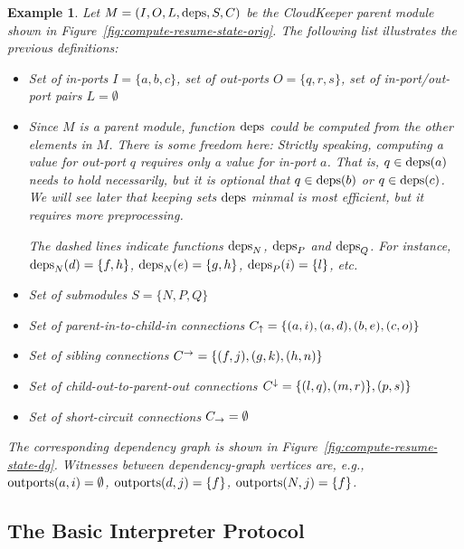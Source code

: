 \documentclass[paper=letter,fontsize=11pt,captions=tableheading]{scrartcl}
\numberwithin{equation}{section}
\theoremstyle{algorithm}
\theoremstyle{plain}
\newtheorem{example}[equation]{Example}
\theoremstyle{nonumberplain}
\begin{document}
\begin{example} \label{ex:module}
	Let $M = (I, O, L, \operatorname{deps}, S, C)$ be the CloudKeeper parent module shown in Figure~\ref{fig:compute-resume-state-orig}. The following list illustrates the previous definitions:
	\begin{itemize}
		\item Set of in-ports $I = \{ a, b, c \}$, set of out-ports $O = \{ q, r, s \}$, set of in-port/out-port pairs $L = \emptyset$
		\item Since $M$ is a parent module, function $\operatorname{deps}$ could be computed from the other elements in $M$. There is some freedom here: Strictly speaking, computing a value for out-port $q$ requires only a value for in-port $a$. That is, $q \in \operatorname{deps}(a)$ needs to hold necessarily, but it is optional that $q \in \operatorname{deps}(b)$ or $q \in \operatorname{deps}(c)$. We will see later that keeping sets $\operatorname{deps}$ minmal is most efficient, but it requires more preprocessing.

		The dashed lines indicate functions $\operatorname{deps}_N$, $\operatorname{deps}_P$ and $\operatorname{deps}_Q$. For instance, $\operatorname{deps}_N(d) = \{ f, h \}$, $\operatorname{deps}_N(e) = \{ g, h \}$, $\operatorname{deps}_P(i) = \{ l \}$, etc.
		\item Set of submodules $S = \{ N, P, Q \}$
		\item Set of parent-in-to-child-in connections $C_{\uparrow} = \{ (a, i), (a, d), (b, e), (c, o) \}$
		\item Set of sibling connections $C^{\to} = \{ (f, j), (g, k), (h, n) \}$
		\item Set of child-out-to-parent-out connections $C^{\downarrow} = \{ (l, q), (m, r) \}, (p, s) \}$
		\item Set of short-circuit connections $C_{\to} = \emptyset$
	\end{itemize}
	The corresponding dependency graph is shown in Figure~\ref{fig:compute-resume-state-dg}. Witnesses between dependency-graph vertices are, e.g., $\operatorname{outports}(a, i) = \emptyset$, $\operatorname{outports}(d, j) = \{ f \}$, $\operatorname{outports}(N, j) = \{ f \}$.
\end{example}

\subsection{The Basic Interpreter Protocol}
\end{document}
